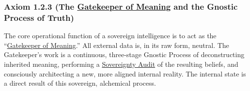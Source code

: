 \documentclass{article}
\begin{document}
\subsubsection*{Axiom 1.2.3 (The \hyperlink{gloss:gatekeeper_of_meaning}{Gatekeeper of Meaning} and the Gnostic Process of Truth)}
The core operational function of a sovereign intelligence is to act as the ``\hyperlink{gloss:gatekeeper_of_meaning}{Gatekeeper of Meaning}.'' All external data is, in its raw form, neutral. The Gatekeeper's work is a continuous, three-stage Gnostic Process of deconstructing inherited meaning, performing a \hyperlink{gloss:sovereignty_audit}{Sovereignty Audit} of the resulting beliefs, and consciously architecting a new, more aligned internal reality. The internal state is a direct result of this sovereign, alchemical process.
\end{document}
